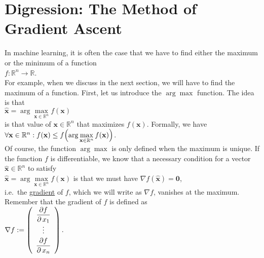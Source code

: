 \section{Digression: The Method of Gradient Ascent \label{section:gradient-ascent}}
In machine learning, it is often the case that we have to find either the maximum or the minimum of a function
\\[0.2cm]
\hspace*{1.3cm}
$f: \mathbb{R}^n \rightarrow \mathbb{R}$.
\\[0.2cm]
For example, when we discuss  in the next section, we will have to find the maximum of a
function.  First, let us introduce the $\arg\max$ function.  The idea is that
\\[0.2cm]
\hspace*{1.3cm}
$\mathbf{\widehat{x}} = \arg\max\limits_{\mathbf{x}\in \mathbb{R}^n} f(\mathbf{x})$
\\[0.2cm]
is that value of $\mathbf{x} \in \mathbb{R}^n$ that maximizes $ f(\mathbf{x})$.  Formally, we have
\\[0.2cm]
\hspace*{1.3cm}
$\forall \mathbf{x} \in \mathbb{R}^n : f(\mathbf{x}) \leq f\Bigl(\arg\max\limits_{\mathbf{x}\in \mathbb{R}^n} f(\mathbf{x})\Bigr)$.
\\[0.2cm]
Of course, the function $\arg\!\max$ is only defined when the maximum is unique.
If the function $f$ is differentiable, we know that a necessary condition for a vector $\mathbf{\widehat{x}} \in \mathbb{R}^n$
to satisfy
\\[0.2cm]
\hspace*{1.3cm}
$\mathbf{\widehat{x}} = \arg\max\limits_{\mathbf{x}\in \mathbb{R}^n} f(\mathbf{x})$ \quad is that we must have \quad $\nabla f(\mathbf{\widehat{x}}) = \mathbf{0}$,
\\[0.2cm]
i.e.~the \href{https://en.wikipedia.org/wiki/Gradient}{gradient} of $f$, which we will write as $\nabla f$,
vanishes at the maximum.  Remember that the gradient of $f$ is defined as
\\[0.2cm]
\hspace*{1.3cm}
$\nabla f := \left(
 \begin{array}{c}
 \displaystyle\frac{\partial f}{\partial\, x_1} \\
    \vdots                            \\[0.1cm]
 \displaystyle\frac{\partial f}{\partial\, x_n} \\ 
 \end{array}
 \right).
$
\vspace*{0.2cm}


